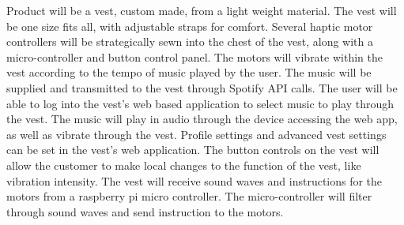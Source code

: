 Product will be a vest, custom made, from a light weight material. The vest will be one size fits all, with adjustable straps for comfort. Several haptic motor controllers will be strategically sewn into the chest of the vest, along with a micro-controller and button control panel. The motors will vibrate within the vest according to the tempo of music played by the user. The music will be supplied and transmitted to the vest through Spotify API calls. The user will be able to log into the vest’s web based application to select music to play through the vest. The music will play in audio through the device accessing the web app, as well as vibrate through the vest. Profile settings and advanced vest settings can be set in the vest’s web application. The button controls on the vest will allow the customer to make local changes to the function of the vest, like vibration intensity. The vest will receive sound waves and instructions for the motors from a raspberry pi micro controller. The micro-controller will filter through sound waves and send instruction to the motors.